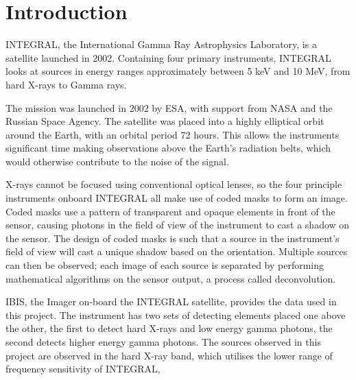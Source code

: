
\chapter{Introduction} %

\label{ch:introduction} %


INTEGRAL, the International Gamma Ray Astrophysics Laboratory, is a satellite launched in 2002. Containing four primary instruments, INTEGRAL looks at sources in energy ranges approximately between 5 keV and 10 MeV, from hard X-rays to Gamma rays.

The mission was launched in 2002 by ESA, with support from NASA and the Russian Space Agency. The satellite was placed into a highly elliptical orbit around the Earth, with an orbital period 72 hours. This allows the instruments significant time making observations above the Earth's radiation belts, which would otherwise contribute to the noise of the signal.

X-rays cannot be focused using conventional optical lenses, so the four principle instruments onboard INTEGRAL all make use of coded masks to form an image. Coded masks use a pattern of transparent and opaque elements in front of the sensor, causing photons in the field of view of the instrument to cast a shadow on the sensor. The design of coded masks is such that a source in the instrument's field of view will cast a unique shadow based on the orientation. Multiple sources can then be observed; each image of each source is separated by performing mathematical algorithms on the sensor output, a process called deconvolution. 

IBIS, the Imager on-board the INTEGRAL satellite, provides the data used in this project. The instrument has two sets of detecting elements placed one above the other, the first to detect hard X-rays and low energy gamma photons, the second detects higher energy gamma photons. The sources observed in this project are observed in the hard X-ray band, which utilises the lower range of frequency sensitivity of INTEGRAL, 